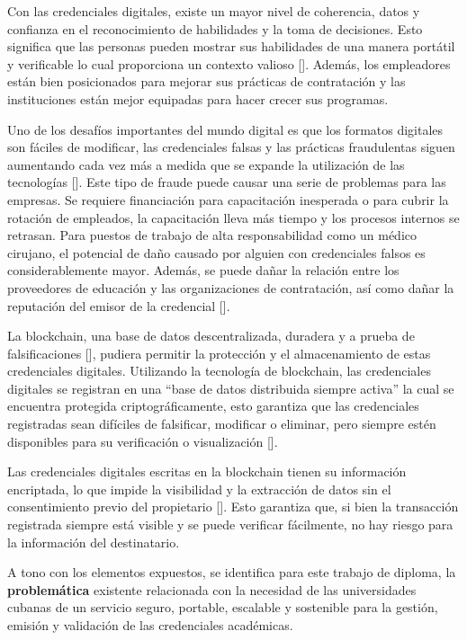 Con las credenciales digitales, existe un mayor nivel de coherencia, datos y confianza en el reconocimiento de habilidades y la toma de decisiones. Esto significa que las personas pueden mostrar sus habilidades de una manera port\'atil y verificable lo cual proporciona un contexto valioso [\cite{64}]. Adem\'as, los empleadores est\'an bien posicionados para mejorar sus pr\'acticas de contrataci\'on y las instituciones est\'an mejor equipadas para hacer crecer sus programas.

Uno de los desaf\'ios importantes del mundo digital es que los formatos digitales son f\'aciles de modificar, las credenciales falsas y las pr\'acticas fraudulentas siguen aumentando cada vez m\'as a medida que se expande la utilizaci\'on de las tecnologías [\cite{65,70}]. Este tipo de fraude puede causar una serie de problemas para las empresas. Se requiere financiaci\'on para capacitaci\'on inesperada o para cubrir la rotaci\'on de empleados, la capacitaci\'on lleva m\'as tiempo y los procesos internos se retrasan. Para puestos de trabajo de alta responsabilidad como un m\'edico cirujano, el potencial de da\~no causado por alguien con credenciales falsos es considerablemente mayor. Adem\'as, se puede da\~nar la relaci\'on entre los proveedores de educaci\'on y las organizaciones de contrataci\'on, as\'i como da\~nar la reputaci\'on del emisor de la credencial [\cite{2}].

La blockchain, una base de datos descentralizada, duradera y a prueba de falsificaciones [\cite{1, 66}], pudiera permitir la protecci\'on y el almacenamiento de estas credenciales digitales. Utilizando la tecnolog\'ia de blockchain, las credenciales digitales se registran en una ``base de datos distribuida siempre activa'' la cual se encuentra protegida criptogr\'aficamente, esto garantiza que las credenciales registradas sean dif\'iciles de falsificar, modificar o eliminar, pero siempre est\'en disponibles para su verificación o visualización [\cite{2}]. 

Las credenciales digitales escritas en la blockchain tienen su información encriptada, lo que impide la visibilidad y la extracción de datos sin el consentimiento previo del propietario [\cite{4,67}]. Esto garantiza que, si bien la transacción registrada siempre está visible y se puede verificar fácilmente, no hay riesgo para la información del destinatario.

A tono con los elementos expuestos, se identifica para este trabajo de diploma, la \textbf{problem\'atica} existente relacionada con la necesidad de las universidades cubanas de un servicio seguro, portable, escalable y sostenible para la gestión, emisión y validación de las credenciales académicas.\par

